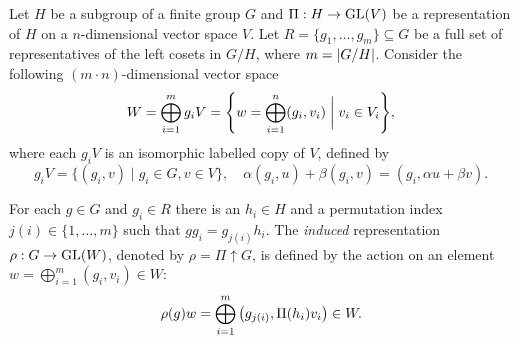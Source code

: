 \documentclass[12pt]{report}
\begin{document}



\begin{definition} \label{def:induction_defi}
Let $H$ be a subgroup of a finite group $G$ and $\Pi: H \to {\text{GL}}(V)$ be a representation of $H$ on a $n$-dimensional vector space $V$. Let $R = \{g_1, \ldots, g_m\} \subseteq G$ be a full set of representatives of the left cosets in $G/H$, where $m = \abs{G/H}$. Consider the following $(m\cdot n)$-dimensional vector space
\begin{equation} \label{eq:W_vectorspace_induction_copies}
W = \bigoplus_{i=1}^m g_i V = \qty{w = \bigoplus_{i=1}^n (g_i, v_i) \;\bigg|\; v_i \in V_i},
\end{equation}
where each $g_i V$ is an isomorphic labelled copy of $V$, defined by
\begin{equation} \label{eq:giV_vectorspace_labelled_copy}
g_i V = \{ (g_i, v) \mid g_i \in G, v \in V\}, \quad
\alpha (g_i, u) + \beta (g_i, v) = (g_i, \alpha u + \beta v).
\end{equation}

For each $g \in G$ and $g_i \in R$ there is an $h_i \in H$ and a permutation index $j(i) \in \{1, \ldots, m\}$ such that $g g_i = g_{j(i)} h_i$. The \textit{induced} representation $\rho: G \to {\text{GL}}(W)$, denoted by $\rho = \Pi \uparrow G$, is defined by the action on an element $w = \bigoplus_{i=1}^{m} (g_i, v_i) \in W$:
\begin{equation} \label{eq:induced_rep_action_defi}
\rho(g) w = \bigoplus_{i=1}^{m} \qty(g_{j(i)}, \Pi(h_i) v_i) \in W.
\end{equation}
\end{definition}
\end{document}
